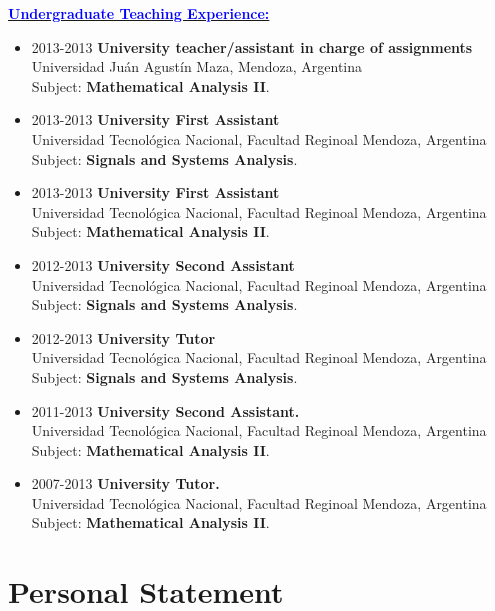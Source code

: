 \documentclass{article}
\newcommand{\statement}[1]{\par\medskip
  \underline{\textcolor{blue}{\textbf{#1:}}}\space
}
\begin{document}
\statement{Undergraduate Teaching Experience}
\begin{itemize}
	\item 2013-2013 {\bf University teacher/assistant in charge of assignments}\\
Universidad Ju\'an Agust\'in Maza, Mendoza, Argentina\\
Subject: \textbf{Mathematical Analysis II}.

	\item 2013-2013 {\bf University First Assistant}\\
Universidad Tecnol\'ogica Nacional, Facultad Reginoal Mendoza, Argentina\\
Subject: \textbf{Signals and Systems Analysis}.

	\item 2013-2013 {\bf University First Assistant}\\
Universidad Tecnol\'ogica Nacional, Facultad Reginoal Mendoza, Argentina\\
Subject: \textbf{Mathematical Analysis II}.

	\item 2012-2013 {\bf University Second Assistant}\\
Universidad Tecnol\'ogica Nacional, Facultad Reginoal Mendoza, Argentina\\
Subject: \textbf{Signals and Systems Analysis}.

	\item 2012-2013 {\bf University Tutor}\\
Universidad Tecnol\'ogica Nacional, Facultad Reginoal Mendoza, Argentina\\
Subject: \textbf{Signals and Systems Analysis}.

	\item 2011-2013 {\bf University Second Assistant.}\\
Universidad Tecnol\'ogica Nacional, Facultad Reginoal Mendoza, Argentina\\
Subject: \textbf{Mathematical Analysis II}.

	\item 2007-2013 {\bf University Tutor.}\\
Universidad Tecnol\'ogica Nacional, Facultad Reginoal Mendoza, Argentina\\
Subject: \textbf{Mathematical Analysis II}.

\end{itemize}
 
\newpage


\section*{Personal Statement}
\end{document}
